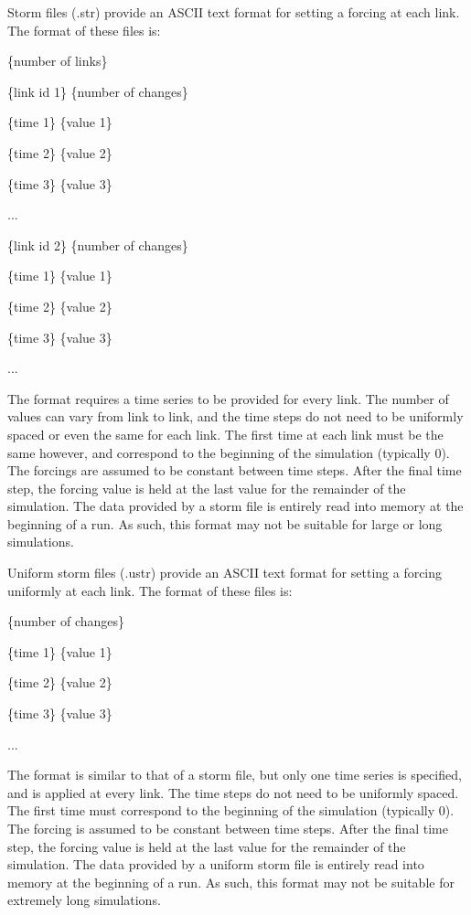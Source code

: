 \documentclass[12pt]{article}
\newenvironment{codeindent}
{\begin{list}{}
        {\setlength{\leftmargin}{.1in}}
        \item[]
}
{\end{list}}
\begin{document}
Storm files (.str) provide an ASCII text format for setting a forcing at each link. The format of these files is:
\begin{codeindent}
 \{number of links\}
 
 \{link id 1\} \{number of changes\}

 \{time 1\} \{value 1\}
 
 \{time 2\} \{value 2\}
 
 \{time 3\} \{value 3\}
 
 ...
 
 \{link id 2\} \{number of changes\}

 \{time 1\} \{value 1\}
 
 \{time 2\} \{value 2\}
 
 \{time 3\} \{value 3\}
 
 ...
\end{codeindent}
The format requires a time series to be provided for every link. The number of values can vary from link to link, and the time steps do not need to be uniformly spaced or even the same for each link. The first time at each link must be the same however, and correspond to the beginning of the simulation (typically 0). The forcings are assumed to be constant between time steps. After the final time step, the forcing value is held at the last value for the remainder of the simulation. The data provided by a storm file is entirely read into memory at the beginning of a run. As such, this format may not be suitable for large or long simulations.

Uniform storm files (.ustr) provide an ASCII text format for setting a forcing uniformly at each link. The format of these files is:
\begin{codeindent}
 \{number of changes\}

 \{time 1\} \{value 1\}
 
 \{time 2\} \{value 2\}
 
 \{time 3\} \{value 3\}
 
 ...
\end{codeindent}
The format is similar to that of a storm file, but only one time series is specified, and is applied at every link. The time steps do not need to be uniformly spaced. The first time must correspond to the beginning of the simulation (typically 0). The forcing is assumed to be constant between time steps. After the final time step, the forcing value is held at the last value for the remainder of the simulation. The data provided by a uniform storm file is entirely read into memory at the beginning of a run. As such, this format may not be suitable for extremely long simulations.
\end{document}
